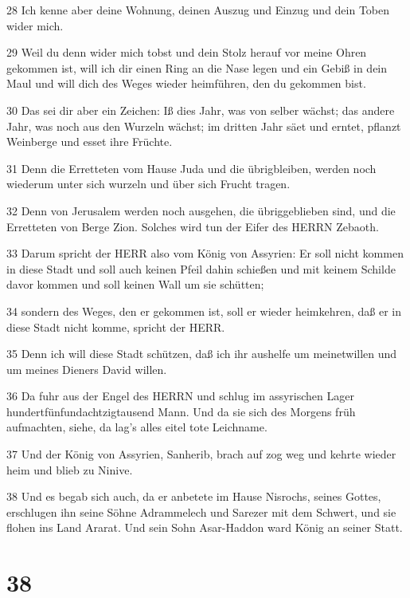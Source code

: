 \par 28 Ich kenne aber deine Wohnung, deinen Auszug und Einzug und dein Toben wider mich.
\par 29 Weil du denn wider mich tobst und dein Stolz herauf vor meine Ohren gekommen ist, will ich dir einen Ring an die Nase legen und ein Gebiß in dein Maul und will dich des Weges wieder heimführen, den du gekommen bist.
\par 30 Das sei dir aber ein Zeichen: Iß dies Jahr, was von selber wächst; das andere Jahr, was noch aus den Wurzeln wächst; im dritten Jahr säet und erntet, pflanzt Weinberge und esset ihre Früchte.
\par 31 Denn die Erretteten vom Hause Juda und die übrigbleiben, werden noch wiederum unter sich wurzeln und über sich Frucht tragen.
\par 32 Denn von Jerusalem werden noch ausgehen, die übriggeblieben sind, und die Erretteten von Berge Zion. Solches wird tun der Eifer des HERRN Zebaoth.
\par 33 Darum spricht der HERR also vom König von Assyrien: Er soll nicht kommen in diese Stadt und soll auch keinen Pfeil dahin schießen und mit keinem Schilde davor kommen und soll keinen Wall um sie schütten;
\par 34 sondern des Weges, den er gekommen ist, soll er wieder heimkehren, daß er in diese Stadt nicht komme, spricht der HERR.
\par 35 Denn ich will diese Stadt schützen, daß ich ihr aushelfe um meinetwillen und um meines Dieners David willen.
\par 36 Da fuhr aus der Engel des HERRN und schlug im assyrischen Lager hundertfünfundachtzigtausend Mann. Und da sie sich des Morgens früh aufmachten, siehe, da lag's alles eitel tote Leichname.
\par 37 Und der König von Assyrien, Sanherib, brach auf zog weg und kehrte wieder heim und blieb zu Ninive.
\par 38 Und es begab sich auch, da er anbetete im Hause Nisrochs, seines Gottes, erschlugen ihn seine Söhne Adrammelech und Sarezer mit dem Schwert, und sie flohen ins Land Ararat. Und sein Sohn Asar-Haddon ward König an seiner Statt.

\chapter{38}

